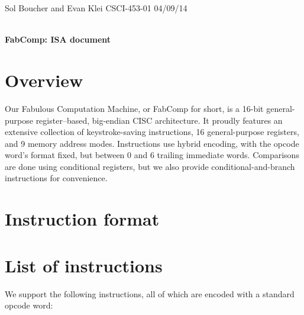 \documentclass[12pt]{article}
\begin{document}
\setlength{\parindent}{0pt}

\begin{framed}
Sol Boucher and Evan Klei \hfill CSCI-453-01 \hfill 04/09/14 \\
\vspace{6pt} \\
\centerline{\textbf{\huge FabComp: ISA document}}
\end{framed}

\section{Overview}
Our Fabulous Computation Machine, or FabComp for short, is a 16-bit general-purpose register--based, big-endian CISC architecture.
It proudly features an extensive collection of keystroke-saving instructions, 16 general-purpose registers, and 9 memory address modes.
Instructions use hybrid encoding, with the opcode word's format fixed, but between 0 and 6 trailing immediate words.
Comparisons are done using conditional registers, but we also provide conditional-and-branch instructions for convenience.

\section{Instruction format}

\section{List of instructions}
We support the following instructions, all of which are encoded with a standard opcode word:
\end{document}
